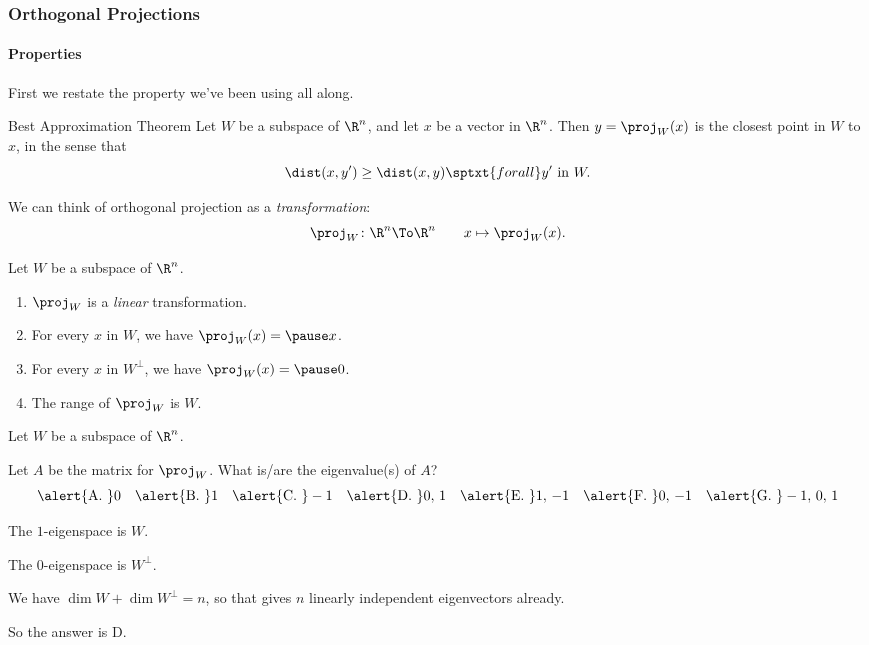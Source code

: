 \begin{frame}
\frametitle{Orthogonal Projections}
\framesubtitle{Properties}

First we restate the property we've been using all along.

\begin{oneoffthm}{Best Approximation Theorem}
  Let $W$ be a subspace of $\R^n$, and let $x$ be a vector in $\R^n$.  Then
  $y = \proj_W(x)$ is the closest point in $W$ to $x$, in the sense that
  \[ \dist(x,y') \geq \dist(x,y) \sptxt{for all} y'\text{ in }W. \]
\end{oneoffthm}

\pause
We can think of orthogonal projection as a \emph{transformation}:
\[ \proj_W\colon\R^n\To\R^n \qquad x \mapsto \proj_W(x). \]

\pause
\begin{thm}
  Let $W$ be a subspace of $\R^n$.
  \pause
  \begin{enumerate}
  \item $\proj_W$ is a \emph{linear} transformation.
    \pause
  \item For every $x$ in $W$, we have $\proj_W(x) = \pause x$.
    \pause
  \item For every $x$ in $W^\perp$, we have $\proj_W(x) = \pause 0$.
    \pause
  \item The range of $\proj_W$ is
    \pause
    $W$.
  \end{enumerate}
\end{thm}

\end{frame}



\begin{pollframe}

Let $W$ be a subspace of $\R^n$.

\begin{bluebox}[Poll]{.9\linewidth}
  Let $A$ be the matrix for $\proj_W$.  What is/are the eigenvalue(s) of $A$?
  \[
  \text{\alert{A. }} 0 \quad
  \text{\alert{B. }} 1 \quad
  \text{\alert{C. }} -1 \quad
  \text{\alert{D. }} 0,\, 1 \quad
  \text{\alert{E. }} 1,\,-1 \quad
  \text{\alert{F. }} 0,\,-1 \quad
  \text{\alert{G. }} -1,\,0,\,1
  \]
\end{bluebox}

\pause\medskip
The $1$-eigenspace is
\pause
$W$.

\pause\medskip
The $0$-eigenspace is
\pause
$W^\perp$.

\pause\medskip
We have $\dim W+\dim W^\perp = n$, so that gives $n$ linearly independent
eigenvectors already.

\pause\medskip
So the answer is \alert{D}.

\end{pollframe}


